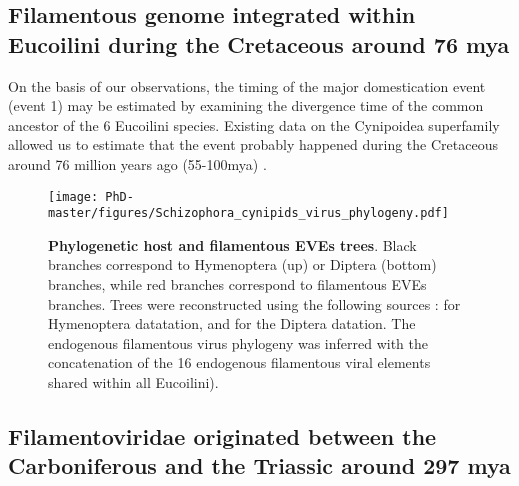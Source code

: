 \subsection{Filamentous genome integrated within Eucoilini during the Cretaceous around 76 mya}

On the basis of our observations, the timing of the major domestication event (event 1) may be estimated by examining the divergence time of the common ancestor of the 6 Eucoilini species. Existing data on the Cynipoidea superfamily allowed us to estimate that the event probably happened during the Cretaceous around 76 million years ago (55-100mya) \citep{blaimer_comprehensive_2020}.

\begin{figure}[!htpbt]
\texttt{[image: PhD-master/figures/Schizophora\_cynipids\_virus\_phylogeny.pdf]}\centering
\caption[Paper3:Schizophora and Eucoilini datation phylogenies]{\textbf{Phylogenetic host and filamentous EVEs trees}. Black branches correspond to Hymenoptera (up) or Diptera (bottom) branches, while red branches correspond to filamentous EVEs branches. Trees were reconstructed using the following sources : \citep{blaimer_comprehensive_2020} for Hymenoptera datatation, and \citep{wiegmann_episodic_2011} for the Diptera datation. The endogenous filamentous virus phylogeny was inferred with the concatenation of the  16 endogenous filamentous viral elements shared within all Eucoilini).}
\label{figure:Schizophora_Eucoilini_virus_phylogeny}

\end{figure}

\subsection{Filamentoviridae originated between the Carboniferous and the Triassic around 297 mya}

